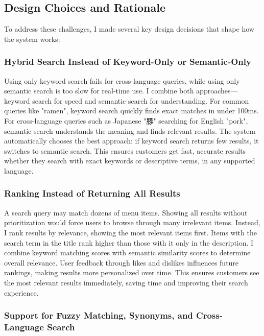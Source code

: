 \documentclass[11pt,a4paper]{article}
\begin{document}
\subsection{Design Choices and Rationale}

To address these challenges, I made several key design decisions that shape how the system works:

\subsubsection{Hybrid Search Instead of Keyword-Only or Semantic-Only}

Using only keyword search fails for cross-language queries, while using only semantic search is too slow for real-time use. I combine both approaches—keyword search for speed and semantic search for understanding. For common queries like "ramen", keyword search quickly finds exact matches in under 100ms. For cross-language queries such as Japanese "豚" searching for English "pork", semantic search understands the meaning and finds relevant results. The system automatically chooses the best approach: if keyword search returns few results, it switches to semantic search. This ensures customers get fast, accurate results whether they search with exact keywords or descriptive terms, in any supported language.

\subsubsection{Ranking Instead of Returning All Results}

A search query may match dozens of menu items. Showing all results without prioritization would force users to browse through many irrelevant items. Instead, I rank results by relevance, showing the most relevant items first. Items with the search term in the title rank higher than those with it only in the description. I combine keyword matching scores with semantic similarity scores to determine overall relevance. User feedback through likes and dislikes influences future rankings, making results more personalized over time. This ensures customers see the most relevant results immediately, saving time and improving their search experience.

\subsubsection{Support for Fuzzy Matching, Synonyms, and Cross-Language Search}
\end{document}
